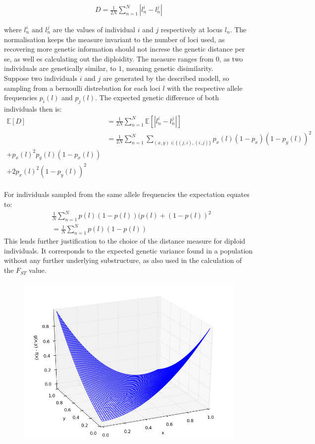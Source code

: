 \documentclass[a4paper, 11pt]{article}
\begin{document}
\begin{align*}
D = \frac{1}{2N}\sum^{N}_{n = 1} |l^i_n - l^j_n|
\end{align*}

where $l^i_n$ and $l^j_n$ are the values of individual $i$ and $j$ respectively at locus $l_n$. The normalisation keeps the measure invariant to the number of loci used, as recovering more genetic information should not increse the genetic distance per se, as well es calculating out the diploidity. The measure ranges from $0$, as two individuals are genetically similar, to $1$, meaning genetic disimilarity.
\\
Suppose two individuals $i$ and $j$ are generated by the described modell, so sampling from a bernoulli distrebution for each loci $l$ with the respective allele frequencies $p_i(l)$ and $p_j(l)$. The expected genetic difference of both individuals then is: 
\begin{align*}
\mathbb{E}[D] &= \frac{1}{2N}\sum^{N}_{n = 1} \mathbb{E}[|l^i_n - l^j_n|] \\
&= \frac{1}{2N} \sum^{N}_{n = 1} \sum_{(x, y) \in \{(j, i), (i, j)\}} p_x(l)(1-p_x)(1-p_y(l))^2 \\
+ p_x(l)^2p_y(l)(1-p_x(l)) \\
+ 2p_x(l)^2(1-p_y(l))^2
\end{align*} \\
For individuals sampled from the same allele frequencies the expectation equates to:
\begin{align*}
& \frac{1}{N} \sum^{N}_{n = 1} p(l)(1-p(l))(p(l)+(1-p(l))^2 \\
&= \frac{1}{N} \sum^{N}_{n = 1} p(l)(1-p(l))
\end{align*}
This lends further justification to the choice of the distance measure for diploid individuals. It corresponds to the expected genetic variance found in a population without any further underlying substructure, as also used in the calculation of the $F_{ST}$ value.\\
\begin{figure}
\includegraphics[scale=0.5]{plot_distance}
\end{figure}
\end{document}
